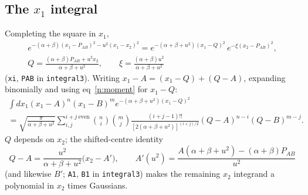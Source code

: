 \documentclass[11pt]{article}
\begin{document}
\subsection{The $x_1$ integral}
Completing the square in $x_1$,
\begin{equation}
\begin{gathered}
e^{-(\alpha+\beta)(x_1-P_{AB})^2-u^2(x_1-x_2)^2}=e^{-(\alpha+\beta+u^2)(x_1-Q)^2}\,e^{-\xi(x_2-P_{AB})^2},\\
Q=\frac{(\alpha+\beta)P_{AB}+u^2x_2}{\alpha+\beta+u^2},\qquad
\xi=\frac{(\alpha+\beta)u^2}{\alpha+\beta+u^2}
\end{gathered}
\label{n:x1}
\end{equation}
(\texttt{xi}, \texttt{PAB} in \texttt{integral3}).  Writing $x_1-A=(x_1-Q)+(Q-A)$, expanding binomially and using
eq~\ref{n:moment} for $x_1-Q$:
\begin{multline}
\int dx_1(x_1-A)^n(x_1-B)^me^{-(\alpha+\beta+u^2)(x_1-Q)^2}\\
=\sqrt{\frac{\pi}{\alpha+\beta+u^2}}\sum_{i,j}^{i+j\ \mathrm{even}}\binom ni\binom mj
\frac{(i+j-1)!!}{[2(\alpha+\beta+u^2)]^{(i+j)/2}}(Q-A)^{n-i}(Q-B)^{m-j}.
\label{n:x1-int}
\end{multline}
$Q$ depends on $x_2$; the shifted-centre identity
\begin{equation}
Q-A=\frac{u^2}{\alpha+\beta+u^2}\bigl(x_2-A'\bigr),\qquad
A'(u^2)=\frac{A(\alpha+\beta+u^2)-(\alpha+\beta)P_{AB}}{u^2}
\label{n:shift}
\end{equation}
(and likewise $B'$; \texttt{A1}, \texttt{B1} in \texttt{integral3}) makes the remaining $x_2$ integrand a
polynomial in $x_2$ times Gaussians.
\end{document}
